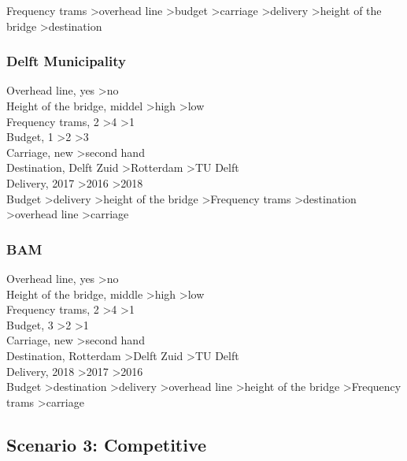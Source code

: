 \documentclass{article}
\begin{document}
Frequency trams \textgreater overhead line \textgreater budget \textgreater carriage \textgreater delivery \textgreater height of the bridge \textgreater destination \\

\subsubsection*{Delft Municipality}
Overhead line, yes \textgreater no\\
Height of the bridge, middel \textgreater high \textgreater low \\
Frequency trams, 2 \textgreater 4 \textgreater 1 \\
Budget, 1 \textgreater 2 \textgreater 3\\
Carriage, new \textgreater second hand\\
Destination, Delft Zuid \textgreater Rotterdam \textgreater TU Delft\\
Delivery, 2017 \textgreater 2016 \textgreater 2018\\

Budget \textgreater delivery \textgreater height of the bridge \textgreater Frequency trams \textgreater destination \textgreater overhead line \textgreater carriage\\

\subsubsection*{BAM}
Overhead line, yes \textgreater no\\
Height of the bridge, middle \textgreater high \textgreater low\\
Frequency trams, 2 \textgreater 4 \textgreater 1\\
Budget, 3 \textgreater 2 \textgreater 1\\
Carriage, new \textgreater second hand\\
Destination, Rotterdam \textgreater Delft Zuid \textgreater TU Delft\\
Delivery, 2018 \textgreater 2017 \textgreater 2016 \\

Budget \textgreater destination \textgreater delivery \textgreater overhead line \textgreater height of the bridge \textgreater Frequency trams \textgreater carriage\\

\subsection{Scenario 3: Competitive}
\end{document}
